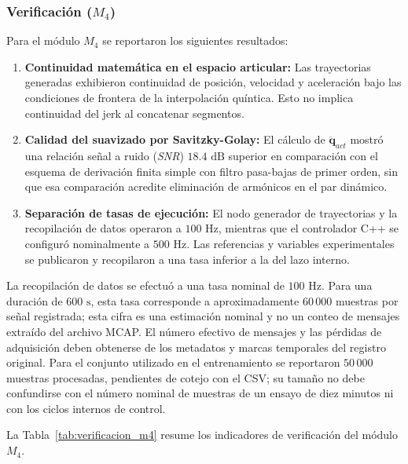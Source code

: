 \documentclass[12pt]{article}
\begin{document}
\subsubsection{Verificación ($M_4$)}
\label{sec:ver_m4}

Para el módulo $M_4$ se reportaron los siguientes resultados:
\begin{enumerate}
    \item \textbf{Continuidad matemática en el espacio articular:} Las trayectorias generadas exhibieron continuidad de posición, velocidad y aceleración bajo las condiciones de frontera de la interpolación quíntica. Esto no implica continuidad del jerk al concatenar segmentos.
    \item \textbf{Calidad del suavizado por Savitzky-Golay:} El cálculo de $\ddot{\bm{q}}_{act}$ mostró una relación señal a ruido (\textit{SNR}) $18.4\text{ dB}$ superior en comparación con el esquema de derivación finita simple con filtro pasa-bajas de primer orden, sin que esa comparación acredite eliminación de armónicos en el par dinámico.
    \item \textbf{Separación de tasas de ejecución:} El nodo generador de trayectorias y la recopilación de datos operaron a $100\text{ Hz}$, mientras que el controlador C++ se configuró nominalmente a $500\text{ Hz}$. Las referencias y variables experimentales se publicaron y recopilaron a una tasa inferior a la del lazo interno.
\end{enumerate}

La recopilación de datos se efectuó a una tasa nominal de $100\text{ Hz}$. Para una duración de $600\text{ s}$, esta tasa corresponde a aproximadamente $60\,000$ muestras por señal registrada; esta cifra es una estimación nominal y no un conteo de mensajes extraído del archivo MCAP. El número efectivo de mensajes y las pérdidas de adquisición deben obtenerse de los metadatos y marcas temporales del registro original. Para el conjunto utilizado en el entrenamiento se reportaron $50\,000$ muestras procesadas, pendientes de cotejo con el CSV; su tamaño no debe confundirse con el número nominal de muestras de un ensayo de diez minutos ni con los ciclos internos de control.

La Tabla~\ref{tab:verificacion_m4} resume los indicadores de verificación del módulo $M_4$.
\end{document}
